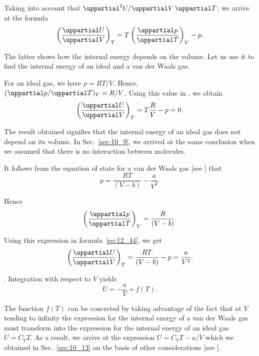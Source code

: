 \noindent
Taking into account that $\uppartial^2U/\uppartial V\,\uppartial T$, we arrive at the formula
\begin{equation}\label{eq:12_44}
	\parenthesis{\diffpartial{U}{V}}_T = T \parenthesis{\diffpartial{p}{T}}_V - p.
\end{equation}

The latter shows how the internal energy depends on the volume. Let us use it to find the internal energy of an ideal and a van der Waals gas.

For an ideal gas, we have $p=RT/V$. Hence, $(\diffinpartial{p}{T})_V=R/V$. Using this value in , we obtain
\begin{equation*}
	\parenthesis{\diffpartial{U}{V}}_T = T\frac{R}{V} - p = 0.
\end{equation*}

\noindent
The result obtained signifies that the internal energy of an ideal gas does not depend on its volume. In Sec.~\ref{sec:10_9}, we arrived at the same conclusion when we assumed that there is no interaction between molecules.

It follows from the equation of state for a van der Waals gas [see ] that
\vspace{-12pt}
\begin{equation}\label{eq:12_45}
	p = \frac{RT}{(V - b)} - \frac{a}{V^2}.
\end{equation}

\noindent
Hence
\begin{equation*}
	\parenthesis{\diffpartial{p}{T}}_V = \frac{R}{(V-b)}.
\end{equation*}

\noindent
Using this expression in formula~\eqref{eq:12_44}, we get
\begin{equation*}
	\parenthesis{\diffpartial{U}{V}}_T = \frac{RT}{(V - b)} - p = \frac{a}{V^2}.
\end{equation*}

. Integration with respect to $V$ yields
\begin{equation*}
	U = -\frac{a}{V} + f(T).
\end{equation*}

\noindent
The function $f(T)$ can be concreted by taking advantage of the fact that at $V$ tending to infinity the expression for the internal energy of a van der Waals gas must transform into the expression for the internal energy of an ideal gas $U=C_VT$. As a result, we arrive at the expression $U=C_VT-a/V$ which we obtained in Sec.~\ref{sec:10_13} on the basis of other considerations [see ].

